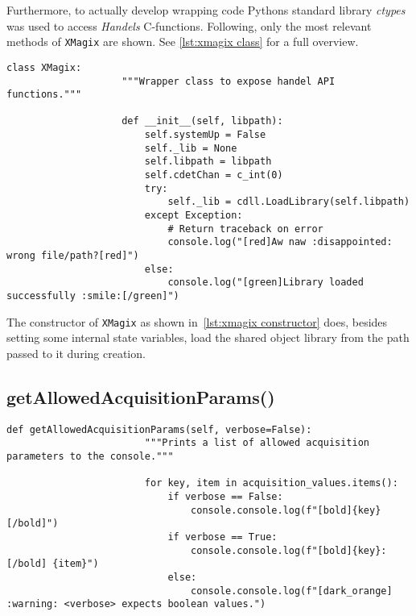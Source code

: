             Furthermore, to actually develop wrapping code Pythons standard library \textit{ctypes} was used to access \textit{Handels} C-functions.
            Following, only the most relevant methods of \texttt{XMagix} are shown.
            See \cref{lst:xmagix class} for a full overview.

            
            \begin{lstlisting}[style=mypython, firstnumber=13, caption={[XMagix class constructor]XMagix class constructor.}, label={lst:xmagix constructor}, gobble=12]
                class XMagix:
                    """Wrapper class to expose handel API functions."""

                    def __init__(self, libpath):
                        self.systemUp = False
                        self._lib = None
                        self.libpath = libpath
                        self.cdetChan = c_int(0)
                        try:
                            self._lib = cdll.LoadLibrary(self.libpath)
                        except Exception:
                            # Return traceback on error
                            console.log("[red]Aw naw :disappointed: wrong file/path?[red]")
                        else:
                            console.log("[green]Library loaded successfully :smile:[/green]")
            \end{lstlisting}
            The constructor of \texttt{XMagix} as shown in~\cref{lst:xmagix constructor} does, besides setting some internal state variables, load the shared object library from the path passed to it during creation.

            \subsection{getAllowedAcquisitionParams()}
                \begin{lstlisting}[style=mypython, firstnumber=46, caption={[XMagix method getAllowedAcquisitionParams()]XMagix method getAllowedAcquisitionParams().}, label={lst:xmagix getAllowedAcquisitionParams}, gobble=16]
                    def getAllowedAcquisitionParams(self, verbose=False):
                        """Prints a list of allowed acquisition parameters to the console."""

                        for key, item in acquisition_values.items():
                            if verbose == False:
                                console.console.log(f"[bold]{key}[/bold]")
                            if verbose == True:
                                console.console.log(f"[bold]{key}:[/bold] {item}")
                            else:
                                console.console.log(f"[dark_orange] :warning: <verbose> expects boolean values.")
                \end{lstlisting}
            
